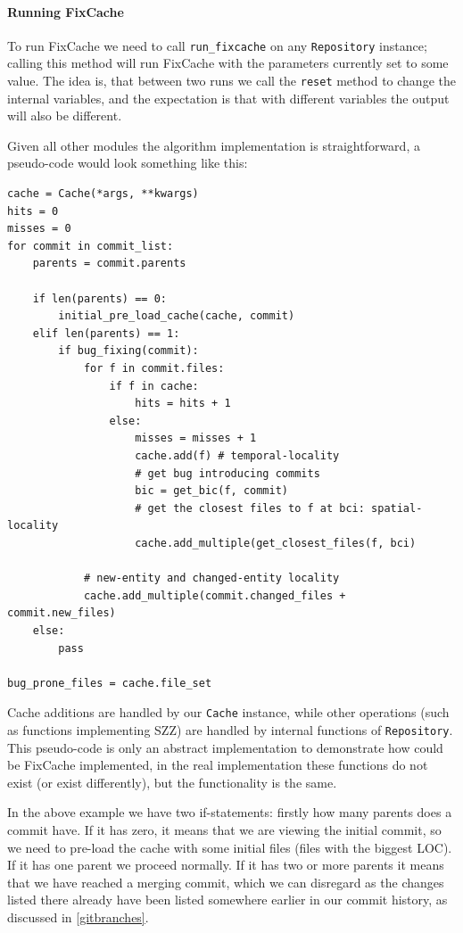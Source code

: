 \documentclass[12pt,twoside,notitlepage]{report}
\newcommand{\fxch}{FixCache }
\begin{document}
\paragraph{Running \fxch}
To run \fxch we need to call \texttt{run\_fixcache} on any \texttt{Repository} instance; calling this method will run \fxch with the parameters currently set to some value. The idea is, that between two runs we call the \texttt{reset} method to change the internal variables, and the expectation is that with different variables the output will also be different.

Given all other modules the algorithm implementation is straightforward, a pseudo-code would look something like this:
\begin{lstlisting}
cache = Cache(*args, **kwargs)
hits = 0
misses = 0
for commit in commit_list:
	parents = commit.parents
	
	if len(parents) == 0:
		initial_pre_load_cache(cache, commit)
	elif len(parents) == 1:
		if bug_fixing(commit):
			for f in commit.files:
				if f in cache:
					hits = hits + 1
				else:
					misses = misses + 1
					cache.add(f) # temporal-locality
					# get bug introducing commits
					bic = get_bic(f, commit)
					# get the closest files to f at bci: spatial-locality
					cache.add_multiple(get_closest_files(f, bci)
			
			# new-entity and changed-entity locality
			cache.add_multiple(commit.changed_files + commit.new_files)
	else:
		pass

bug_prone_files = cache.file_set
\end{lstlisting}
Cache additions are handled by our \texttt{Cache} instance, while other operations (such as functions implementing SZZ) are handled by internal functions of \texttt{Repository}. This pseudo-code is only an abstract implementation to demonstrate how could be \fxch implemented, in the real implementation these functions do not exist (or exist differently), but the functionality is the same.

In the above example we have two if-statements: firstly how many parents does a commit have. If it has zero, it means that we are viewing the initial commit, so we need to pre-load the cache with some initial files (files with the biggest LOC). If it has one parent we proceed normally. If it has two or more parents it means that we have reached a merging commit, which we can disregard as the changes listed there already have been listed somewhere earlier in our commit history, as discussed in \ref{gitbranches}.
\end{document}
